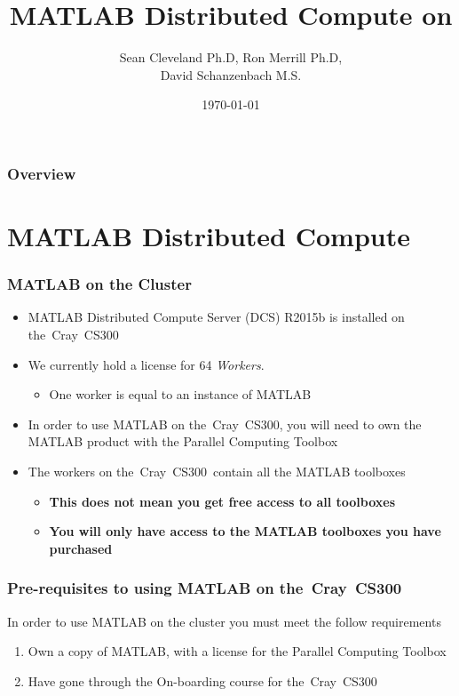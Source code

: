 \documentclass[t]{beamer}
\title[MATLAB on \CNAME]{MATLAB Distributed Compute on \CNAME } %
\author{Sean Cleveland Ph.D, Ron Merrill Ph.D,\\David Schanzenbach M.S.} %
\institute[University of Hawai\okina{}i -- ITS--CI] %
{
	Information Technology Services \\
	Cyberinfrastructure \\
	University of Hawai\okina{}i \\ %
	\medskip
	\textbf{\url{https://www.hawaii.edu/its/ci/}}\\
	\textbf{\textit{uh-hpc-help@lists.hawaii.edu}} %
}
\date{\today} %
\newcommand{\CNAME}{the~Cray~CS300}
\newcommand{\TOTWRKS}{64}
\begin{document}
\begin{frame}
  \titlepage %
\end{frame}

\begin{frame}
  \frametitle{Overview} %
  \tableofcontents[] %
\end{frame}

\section{MATLAB Distributed Compute}

\begin{frame}
	\frametitle{MATLAB on the Cluster}
	\begin{itemize}
		\item MATLAB Distributed Compute Server (DCS) R2015b is installed on \CNAME
		\item We currently hold a license for \TOTWRKS{} \emph{Workers}.
			\begin{itemize}
				\item One worker is equal to an instance of MATLAB
			\end{itemize}
		\item In order to use MATLAB on \CNAME, you will need to own the MATLAB product with the Parallel Computing Toolbox
		\item The workers on \CNAME~contain all the MATLAB toolboxes
		\begin{itemize}
			\item \textbf{This does not mean you get free access to all toolboxes}
			\item \textbf{You will only have access to the MATLAB toolboxes you have purchased}
		\end{itemize}            
	\end{itemize}
\end{frame}


\begin{frame}
  \frametitle{Pre-requisites to using MATLAB on \CNAME{}}
  In order to use MATLAB on the cluster you must meet the follow requirements
  \begin{enumerate}
  \item Own a copy of MATLAB, with a license for the Parallel Computing Toolbox
  \item Have gone through the On-boarding course for \CNAME
  \end{enumerate}
\end{frame}
\end{document}
